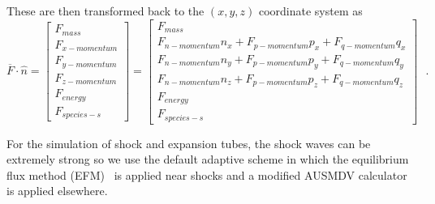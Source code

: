 These are then transformed back to the $(x,y,z)$ coordinate system as
%
\begin{equation}
   \overline{F} \cdot \hat{n} =
   \left[
   \begin{array}{l}
      F_{mass} \\
      F_{x-momentum} \\
      F_{y-momentum} \\
      F_{z-momentum} \\
      F_{energy} \\
      F_{species-s}
   \end{array}
   \right]
   =
   \left[
   \begin{array}{l}
      F_{mass} \\
      F_{n-momentum} n_x + F_{p-momentum} p_x + F_{q-momentum} q_x \\
      F_{n-momentum} n_y + F_{p-momentum} p_y + F_{q-momentum} q_y \\
      F_{n-momentum} n_z + F_{p-momentum} p_z + F_{q-momentum} q_z \\
      F_{energy} \\
      F_{species-s}
   \end{array}
   \right] ~~~.
\end{equation}

\medskip
For the simulation of shock and expansion tubes, the shock waves can be extremely strong
so we use the default adaptive scheme in which the equilibrium flux method (EFM)~\cite{macrossan_89} 
is applied near shocks and a modified AUSMDV calculator~\cite{wada_liou_94a} is applied elsewhere.

